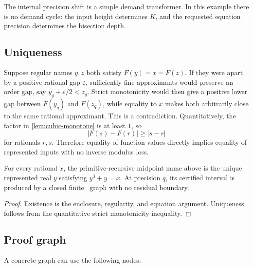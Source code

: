 The internal precision shift is a simple demand transformer.  In this example there is no demand cycle: the input height determines \(K\), and the requested equation precision determines the bisection depth.

\subsection{Uniqueness}

Suppose regular names \(y,z\) both satisfy \(F(y)=x=F(z)\).  If they were apart by a positive rational gap \(\varepsilon\), sufficiently fine approximants would preserve an order gap, say \(y_q+\varepsilon/2<z_q\).  Strict monotonicity would then give a positive lower gap between \(F(y_q)\) and \(F(z_q)\), while equality to \(x\) makes both arbitrarily close to the same rational approximant.  This is a contradiction.  Quantitatively, the factor in \cref{lem:cubic-monotone} is at least \(1\), so
\[
 |F(s)-F(r)|\ge |s-r|
\]
for rationals \(r,s\).  Therefore equality of function values directly implies equality of represented inputs with no inverse modulus loss.

\begin{theorem}\label{thm:cubic-inverse}
For every rational \(x\), the primitive-recursive midpoint name above is the unique represented real \(y\) satisfying \(y^3+y=x\).  At precision \(q\), its certified interval is produced by a closed finite \CIFER\ graph with no residual boundary.
\end{theorem}

\begin{proof}
Existence is the enclosure, regularity, and equation argument.  Uniqueness follows from the quantitative strict monotonicity inequality.
\end{proof}

\subsection{Proof graph}

A concrete graph can use the following nodes:

